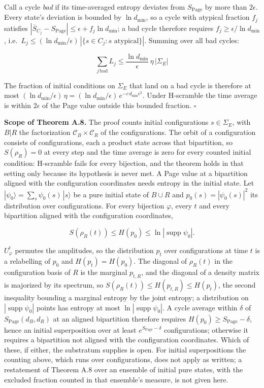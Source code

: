\documentclass[
]{article}
\begin{document}
Call a cycle \emph{bad} if its time-averaged entropy deviates from
\(S_{\text{Page}}\) by more than \(2\epsilon\). Every state's deviation
is bounded by \(\ln d_{\min}\), so a cycle with atypical fraction
\(f_j\) satisfies
\(|\overline{S}_{C_j} - S_{\text{Page}}| \leq \epsilon + f_j \ln d_{\min}\);
a bad cycle therefore requires \(f_j \geq \epsilon/\ln d_{\min}\),
i.e.~\(L_j \leq (\ln d_{\min}/\epsilon)\,|\{s \in C_j : s \text{ atypical}\}|\).
Summing over all bad cycles:

\[\sum_{j \,\text{bad}} L_j \leq \frac{\ln d_{\min}}{\epsilon}\,\eta\,|\Sigma_E|\]

The fraction of initial conditions on \(\Sigma_E\) that land on a bad
cycle is therefore at most
\((\ln d_{\min}/\epsilon)\,\eta = (\ln d_{\min}/\epsilon)\,e^{-c\,d_{\min}\epsilon^2}\).
Under H-scramble the time average is within \(2\epsilon\) of the Page
value outside this bounded fraction. \(\square\)

\textbf{Scope of Theorem A.8.} The proof counts initial configurations
\(s \in \Sigma_E\), with \(B|R\) the factorization
\(\mathcal{C}_B \times \mathcal{C}_R\) of the configurations. The orbit
of a configuration consists of configurations, each a product state
across that bipartition, so \(S(\rho_R) = 0\) at every step and the time
average is zero for every counted initial condition: H-scramble fails
for every bijection, and the theorem holds in that setting only because
its hypothesis is never met. A Page value at a bipartition aligned with
the configuration coordinates needs entropy in the initial state. Let
\(|\psi_0\rangle = \sum_s \psi_0(s)\,|s\rangle\) be a pure initial state
of \(B \cup R\) and \(p_0(s) = |\psi_0(s)|^2\) its distribution over
configurations. For every bijection \(\varphi\), every \(t\) and every
bipartition aligned with the configuration coordinates,

\[S(\rho_R(t)) \leq H(p_0) \leq \ln|\operatorname{supp}\psi_0|.\]

\(U_\varphi^t\) permutes the amplitudes, so the distribution \(p_t\)
over configurations at time \(t\) is a relabelling of \(p_0\) and
\(H(p_t) = H(p_0)\). The diagonal of \(\rho_R(t)\) in the configuration
basis of \(R\) is the marginal \(p_{t,R}\), and the diagonal of a
density matrix is majorized by its spectrum, so
\(S(\rho_R(t)) \leq H(p_{t,R}) \leq H(p_t)\), the second inequality
bounding a marginal entropy by the joint entropy; a distribution on
\(|\operatorname{supp}\psi_0|\) points has entropy at most
\(\ln|\operatorname{supp}\psi_0|\). A cycle average within \(\delta\) of
\(S_{\text{Page}}(d_B, d_R)\) at an aligned bipartition therefore
requires \(H(p_0) \geq S_{\text{Page}} - \delta\), hence an initial
superposition over at least \(e^{S_{\text{Page}} - \delta}\)
configurations; otherwise it requires a bipartition not aligned with the
configuration coordinates. Which of these, if either, the substratum
supplies is open. For initial superpositions the counting above, which
runs over configurations, does not apply as written; a restatement of
Theorem A.8 over an ensemble of initial pure states, with the excluded
fraction counted in that ensemble's measure, is not given here.
\end{document}
